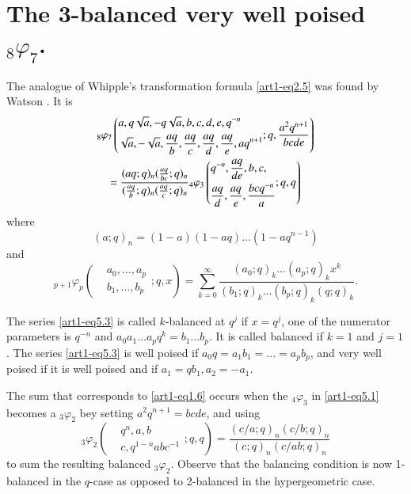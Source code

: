 \section{The 3-balanced very well poised ${}_8 \varphi_7$.}\label{art1-sec5}
The analogue of Whipple's transformation formula \eqref{art1-eq2.5} was found by Watson \cite{art1-key13}. It is 
\setcounter{equation}{0}
\begin{gather}
{}_8 \varphi_7 \left(
\begin{aligned}
& a, q \sqrt{a}, - q \sqrt{a}, b, c, d, e, q^{-n}\\
& \sqrt{a}, - \sqrt{a}, \frac{aq}{b}, \frac{aq}{c}, \frac{aq}{d}, \frac{aq}{e}, aq^{n+1}
\end{aligned};q, \frac{a^2q^{n+1}}{bcde}
 \right)
\label{art1-eq5.1}\\
= \frac{(aq;q)_n (\frac{aq}{bc};q)_n}{(\frac{aq}{b}; q)_n (\frac{aq}{c};q)_n} {}_4 \varphi_3 
\left(
\begin{aligned}
& q^{-n} , \frac{aq}{de}, b, c, \\
& \frac{aq}{d},\frac{aq}{e}, \frac{bcq^{-n}}{a}
\end{aligned} ; q,q
 \right) \notag
\end{gather}
where 
\begin{equation}
(a;q)_n = (1-a) (1-aq) \ldots (1-aq^{n-1}) \label{art1-eq5.2}
\end{equation}
and
\begin{equation}
{}_{p+1} \varphi_p 
\left(\begin{aligned}
& a_0, \ldots, a_p\\
& b_1, \ldots, b_p
\end{aligned} ; q, x
\right)  =\sum\limits^\infty_{k=0} 
\frac{(a_0; q)_k \ldots (a_p; q)_k x^k}{(b_1; q)_k \ldots (b_p; q)_k (q;q)_k}.
\label{art1-eq5.3}
\end{equation}

The series \eqref{art1-eq5.3} is called $k$-balanced at $q^j$ if $x = q^j$, one of the numerator parameters is $q^{-n}$ and $a_0 a_1\ldots a_p q^k =b_1\ldots b_p$. It is called balanced if $k=1$ and $j=1$. The series \eqref{art1-eq5.3} is well poised if $a_0q = a_1 b_1 = \ldots =a_p b_p$, and very well poised if it is well poised and if $a_1 = q b_1, a_2 = -a_1$.

The sum that corresponds to \eqref{art1-eq1.6} occurs when the ${}_4 \varphi_3$ in \eqref{art1-eq5.1} becomes a ${}_3 \varphi_2$ bey setting $a^2 q^{n+1} = bcde$, and using 
\begin{equation}
{}_3 \varphi_2 
\left(
\begin{aligned}
& q^n, a, b\\
& c, q^{1-n} abc^{-1}  
\end{aligned};q, q
\right) = \frac{(c/a;q)_n(c/b;q)_n}{(c;q)_n(c/ab;q)_n}
\label{art1-eq5.4}
\end{equation}
to sum the resulting balanced ${}_3 \varphi_2$. Observe that the balancing condition is now 1-balanced in the $q$-case as opposed to 2-balanced in the hypergeometric case.

